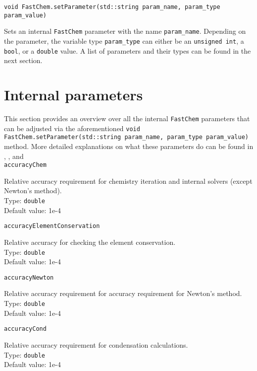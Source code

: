 \documentclass[numbers=noenddot]{aux/fcmanual}
\newcommand{\fc}{\texttt{FastChem}\xspace}
\begin{document}
\bigbreak

\lstinline!void FastChem.setParameter(std::string param_name, param_type param_value)!
\begin{addmargin}[25pt]{0pt}
	Sets an internal \fc parameter with the name \lstinline!param_name!. Depending on the parameter, the variable type \lstinline!param_type! can either be an \lstinline!unsigned int!, a \lstinline!bool!, or a \lstinline!double! value. A list of parameters and their types can be found in the next section.
\end{addmargin}



\section{Internal parameters}
\label{sect:fc_param}

This section provides an overview over all the internal \fc parameters that can be adjusted via the aforementioned \lstinline!void FastChem.setParameter(std::string param_name, param_type param_value)! method. More detailed explanations on what these parameters do can be found in \citet{Stock2018MNRAS.479..865S}, \citet{Stock2022MNRAS.517.4070S}, and \citet{Kitzmann2023inprep}\\


\lstinline!accuracyChem!
\begin{addmargin}[25pt]{0pt}
	Relative accuracy requirement for chemistry iteration and internal solvers (except Newton's method).\\
	Type: \lstinline!double!\\
	Default value: 1e-4
\end{addmargin}

\lstinline!accuracyElementConservation!
\begin{addmargin}[25pt]{0pt}
	Relative accuracy for checking the element conservation.\\
	Type: \lstinline!double!\\
	Default value: 1e-4
\end{addmargin}

\lstinline!accuracyNewton!
\begin{addmargin}[25pt]{0pt}
	Relative accuracy requirement for accuracy requirement for Newton's method.\\
	Type: \lstinline!double!\\
	Default value: 1e-4
\end{addmargin}

\lstinline!accuracyCond!
\begin{addmargin}[25pt]{0pt}
	Relative accuracy requirement for condensation calculations.\\
	Type: \lstinline!double!\\
	Default value: 1e-4
\end{addmargin}
\end{document}

